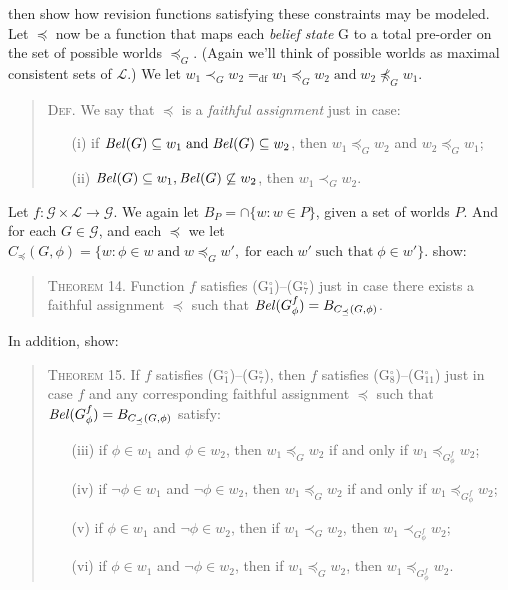 \citet{DarwichePearle} then show how revision functions satisfying these constraints may be modeled. 
Let $\preceq$ now be a function that maps each \textit{belief state} G to a total pre-order on the set of possible worlds $\preceq_G$. 
(Again we'll think of possible worlds as maximal consistent sets of $\mathcal{L}$.)
We let $w_1 \prec_G w_2 =_{\text{df}} w_1 \preceq_G w_2 \; \text{and} \; w_2 \not \preceq_G w_1$.
\begin{quote}
\textsc{Def.}\; We say that $\preceq$ is a \textit{faithful assignment} just in case:
\begin{itemize}
\item[(i)] if $\text{\textit{Bel}}(G) \subseteq w_1 \; \text{and} \; \text{\textit{Bel}}(G) \subseteq w_2$, then $w_1 \preceq_G w_2$ and $w_2 \preceq_G w_1$;
\item[(ii)] $\text{\textit{Bel}}(G) \subseteq w_1,  \text{\textit{Bel}}(G) \not \subseteq w_2$, then $w_1 \prec_G w_2$.
\end{itemize}
\end{quote}

Let $f: \mathcal{G} \times \mathcal{L} \rightarrow \mathcal{G}$.
We again let $B_P = \cap \{w: w \in P \}$, given a set of worlds $P$.
And for each $G \in \mathcal{G}$, and each $\preceq$ we let $C_\preceq(G, \phi) = \{w: \phi \in w \; \text{and} \; w \preceq_G w', \;\text{for each} \; w' \; \text{such that} \; \phi \in w' \}$.
\citet{DarwichePearle} show:
\begin{quote}
\textsc{Theorem 14.}\; Function $f$ satisfies (G$^\circ_1$)--(G$^\circ_7$) just in case there exists a faithful assignment $\preceq$ such that $\text{\textit{Bel}}(G^f_\phi) = B_{C_\preceq(G, \phi)}$.
\end{quote}
In addition, \citet{DarwichePearle} show:
\begin{quote}
\textsc{Theorem 15.}\;  If $f$ satisfies (G$^\circ_1$)--(G$^\circ_7$), then $f$ satisfies (G$^\circ_8$)--(G$^\circ_{11}$) just in case $f$ and any corresponding faithful assignment $\preceq$ such that $\text{\textit{Bel}}(G^f_\phi) = B_{C_\preceq(G, \phi)}$ satisfy:
\begin{itemize}
\item[(iii)] if $\phi \in w_1$ and $\phi \in w_2$, then $w_1 \preceq_{G} w_2$ if and only if $w_1 \preceq_{G^f_\phi} w_2$;
\item[(iv)]  if $\lnot \phi \in w_1$ and $\lnot \phi \in w_2$, then $w_1 \preceq_G w_2$ if and only if $w_1 \preceq_{G^f_\phi} w_2$;
\item[(v)] if $\phi \in w_1$ and $\lnot \phi \in w_2$, then if $w_1 \prec_G w_2$, then $w_1 \prec_{G^f_\phi} w_2$;
\item[(vi)] if $\phi \in w_1$ and $\lnot \phi \in w_2$, then if $w_1 \preceq_G w_2$, then $w_1 \preceq_{G^f_\phi} w_2$.
\end{itemize}
\end{quote}

